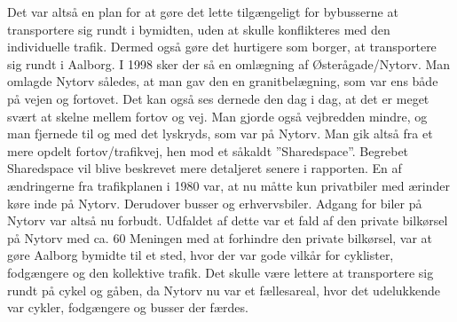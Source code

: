 Det var altså en plan for at gøre det lette tilgængeligt for bybusserne at transportere sig rundt i bymidten, uden at skulle konflikteres med den individuelle trafik. Dermed også gøre det hurtigere som borger, at transportere sig rundt i Aalborg.
I 1998 sker der så en omlægning af Østerågade/Nytorv. 
Man omlagde Nytorv således, at man gav den en granitbelægning, som var ens både på vejen og fortovet. Det kan også ses dernede den dag i dag, at det er meget svært at skelne mellem fortov og vej. Man gjorde også vejbredden mindre, og man fjernede til og med det lyskryds, som var på Nytorv. Man gik altså fra et mere opdelt fortov/trafikvej, hen mod et såkaldt ”Sharedspace”. Begrebet Sharedspace vil blive beskrevet mere detaljeret senere i rapporten. En af ændringerne fra trafikplanen i 1980 var, at nu måtte kun privatbiler med ærinder køre inde på Nytorv. Derudover busser og erhvervsbiler. Adgang for biler på Nytorv var altså nu forbudt. Udfaldet af dette var et fald af den private bilkørsel på Nytorv med ca. 60%
Meningen med at forhindre den private bilkørsel, var at gøre Aalborg bymidte til et sted, hvor der var gode vilkår for cyklister, fodgængere og den kollektive trafik. Det skulle være lettere at transportere sig rundt på cykel og gåben, da Nytorv nu var et fællesareal, hvor det udelukkende var cykler, fodgængere og busser der færdes.

